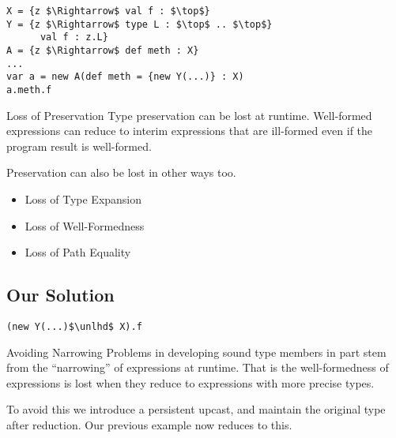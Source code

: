 \documentclass[dvipsnames]{beamer}
\begin{document}
\begin{lrbox}{\tmExPreservationA}
\begin{lstlisting}[mathescape, style=customlang]
X = {z $\Rightarrow$ val f : $\top$}
Y = {z $\Rightarrow$ type L : $\top$ .. $\top$}
	  val f : z.L}
A = {z $\Rightarrow$ def meth : X}
...
var a = new A(def meth = {new Y(...)} : X)
a.meth.f
\end{lstlisting}
\end{lrbox}

\begin{frame}{Loss of Preservation}
Type preservation can be lost at runtime. Well-formed expressions can reduce to interim expressions that are ill-formed even if the program result is well-formed.
\begin{block}{ }
\usebox{\tmExPreservationA}
\end{block}
Preservation can also be lost in other ways too.
\begin{itemize}
\item
Loss of Type Expansion
\item
Loss of Well-Formedness
\item
Loss of Path Equality
\end{itemize}
\end{frame}

\subsection{Our Solution}

\begin{lrbox}{\tmExPreservationB}
\begin{lstlisting}[mathescape, style=customlang]
(new Y(...)$\unlhd$ X).f
\end{lstlisting}
\end{lrbox}

\begin{frame}{Avoiding Narrowing}
Problems in developing sound type members in part stem from the ``narrowing'' of expressions at runtime. That is the well-formedness of expressions is lost when they reduce to expressions with more precise types.

To avoid this we introduce a persistent upcast, and maintain the original type after reduction. Our previous example now reduces to this.
\begin{block}{ }
\usebox{\tmExPreservationB}
\end{block}

\end{frame}
\end{document}
